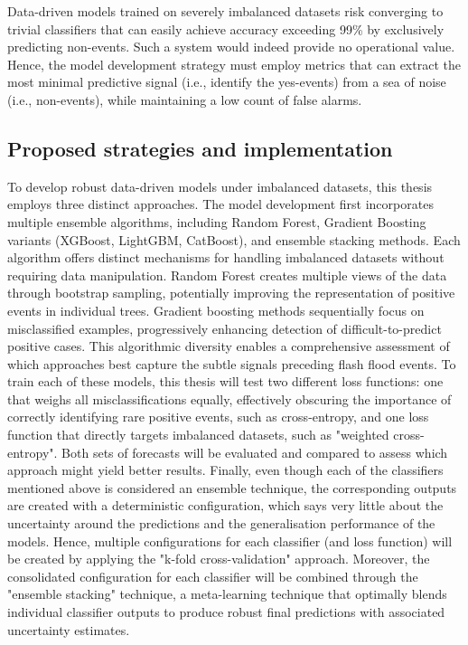 Data-driven  models trained on severely imbalanced datasets risk converging to trivial classifiers that can easily achieve accuracy exceeding 99\% by exclusively predicting non-events. Such a system would indeed provide no operational value. Hence, the model development strategy must employ metrics that can extract the most minimal predictive signal (i.e., identify the yes-events) from a sea of noise (i.e., non-events), while maintaining a low count of false alarms.

\subsection{Proposed strategies and implementation}

To  develop robust data-driven models under imbalanced datasets, this thesis employs three distinct approaches. The model development first incorporates multiple ensemble algorithms, including Random Forest, Gradient Boosting variants (XGBoost, LightGBM, CatBoost), and ensemble stacking methods. Each algorithm offers distinct mechanisms for handling imbalanced datasets without requiring data manipulation. Random Forest creates multiple views of the data through bootstrap sampling, potentially improving the representation of positive events in individual trees. Gradient boosting methods sequentially focus on misclassified examples, progressively enhancing detection of difficult-to-predict positive cases. This algorithmic diversity enables a comprehensive assessment of which approaches best capture the subtle signals preceding flash flood events. To train each of these models, this thesis will test two different loss functions: one that weighs all misclassifications equally, effectively obscuring the importance of correctly identifying rare positive events, such as cross-entropy, and one loss function that directly targets imbalanced datasets, such as "weighted cross-entropy". Both sets of forecasts will be evaluated and compared to assess which approach might yield better results. Finally, even though each of the classifiers mentioned above is considered an ensemble technique, the corresponding outputs are created with a deterministic configuration, which says very little about the uncertainty around the predictions and the generalisation performance of the models. Hence, multiple configurations for each classifier (and loss function) will be created by applying the "k-fold cross-validation" approach. Moreover, the consolidated configuration for each classifier will be combined through the "ensemble stacking" technique, a meta-learning technique that optimally blends individual classifier outputs to produce robust final predictions with associated uncertainty estimates.


